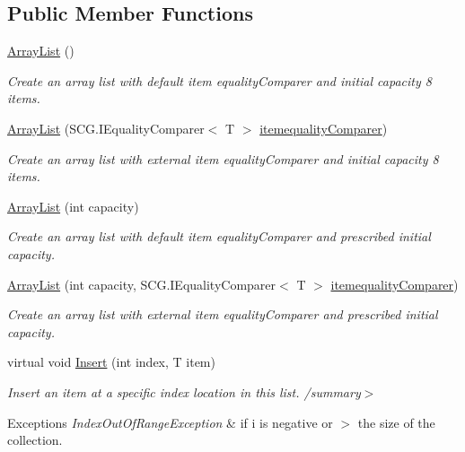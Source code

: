 \subsection*{Public Member Functions}
\begin{DoxyCompactItemize}
\item 
\hyperlink{class_c5_1_1_array_list_afc3bc6f60671256fe1c9c6ade8b1ef45}{Array\+List} ()
\begin{DoxyCompactList}\small\item\em Create an array list with default item equality\+Comparer and initial capacity 8 items. \end{DoxyCompactList}\item 
\hyperlink{class_c5_1_1_array_list_aaed80fc15085f472c99a317acceb1010}{Array\+List} (S\+C\+G.\+I\+Equality\+Comparer$<$ T $>$ \hyperlink{class_c5_1_1_collection_base_a95e343400be0e8f3f8d6310f1aaf2cc6}{itemequality\+Comparer})
\begin{DoxyCompactList}\small\item\em Create an array list with external item equality\+Comparer and initial capacity 8 items. \end{DoxyCompactList}\item 
\hyperlink{class_c5_1_1_array_list_a4bf6bc33f17a8ba8978e24a0058d8dd7}{Array\+List} (int capacity)
\begin{DoxyCompactList}\small\item\em Create an array list with default item equality\+Comparer and prescribed initial capacity. \end{DoxyCompactList}\item 
\hyperlink{class_c5_1_1_array_list_a0ed9d4461ca964278f8221ed2b1b829a}{Array\+List} (int capacity, S\+C\+G.\+I\+Equality\+Comparer$<$ T $>$ \hyperlink{class_c5_1_1_collection_base_a95e343400be0e8f3f8d6310f1aaf2cc6}{itemequality\+Comparer})
\begin{DoxyCompactList}\small\item\em Create an array list with external item equality\+Comparer and prescribed initial capacity. \end{DoxyCompactList}\item 
virtual void \hyperlink{class_c5_1_1_array_list_a4716054131d8c9c4a60eefe0e3d9e97f}{Insert} (int index, T item)
\begin{DoxyCompactList}\small\item\em Insert an item at a specific index location in this list. /summary$>$ 
\begin{DoxyExceptions}{Exceptions}
{\em Index\+Out\+Of\+Range\+Exception} & if i is negative or $>$ the size of the collection. \\
\hline
\end{DoxyExceptions}


\end{DoxyCompactList}
\end{DoxyCompactItemize}
